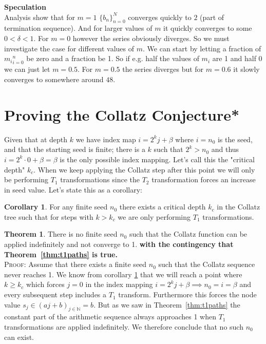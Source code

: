 \documentclass{article}
\theoremstyle{definition}
\newtheorem{theorem}{Theorem}[section]
\newtheorem{corollary}{Corollary}[section]
\begin{document}
%
\noindent
\textbf{Speculation}
\\
Analysis show that for $m=1$ $\{b_n\}_{n=0}^{N}$ converges quickly to $2$ (part of termination sequence). And for larger values of $m$ it quickly converges to some $0<\delta<1$. For $m=0$ however the series obviously diverges. So we must investigate the case for different values of $m$. We can start by letting a fraction of ${m_i}_{i=0}^n$ be zero and a fraction be 1. So if e.g. half the values of $m_i$ are 1 and half 0 we can just let $m=0.5$. For $m=0.5$ the series diverges but for $m=0.6$ it slowly converges to somewhere around $48$.


\section{Proving the Collatz Conjecture*}\label{sec:proof}
Given that at depth $k$ we have index map $i=2^kj+\beta$ where $i=n_0$ is the seed, and that the starting seed is finite; there is a $k$ such that $2^k>n_0$ and thus $i=2^k\cdot0+\beta=\beta$ is the only possible index mapping. Let's call this the "critical depth" $k_c$. When we keep applying the Collatz step after this point we will only be performing $T_1$ transformations since the $T_2$ transformation forces an increase in seed value. Let's state this as a corollary:
\begin{corollary}\label{cor:criticaldepth}
For any finite seed $n_0$ there exists a critical depth $k_c$ in the Collatz tree such that for steps with $k>k_c$ we are only performing $T_1$ transformations.
\end{corollary}
%
\begin{theorem}\label{thm:collatz} There is no finite seed $n_0$ such that the Collatz function can be applied indefinitely and not converge to 1. \textbf{with the contingency that Theorem~\ref{thm:t1paths} is true.}
%
\\[.2cm]
%
\textsc{Proof:} Assume that there exists a finite seed $n_0$ such that the Collatz sequence never reaches 1. We know from corollary \ref{cor:criticaldepth} that we will reach a point where $k\geq k_c$ which forces $j=0$ in the index mapping $i=2^kj+\beta \implies n_0=i=\beta$ and every subsequent step includes a $T_1$ transform. Furthermore this forces the node value $s_j\in (aj+b)_{j\in\mathbb{N}} = b$. But as we saw in Theorem~\ref{thm:t1paths} the constant part of the arithmetic sequence always approaches 1 when $T_1$ transformations are applied indefinitely. We therefore conclude that no such $n_0$ can exist.
\end{theorem}
\end{document}
